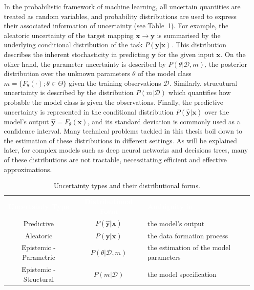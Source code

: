 In the probabilistic framework of machine learning, all uncertain quantities are treated as random variables, and 
probability distributions are used to express their associated information of uncertainty (see Table~\ref{tab:UncTypes}). For example, the aleatoric uncertainty of the target mapping $\textbf{x} \rightarrow \mathbf{y}$ is summarised by the underlying conditional distribution of the task $P(\mathbf{y}|\mathbf{x})$. This distribution describes the inherent stochasticity in predicting $\mathbf{y}$ for the given input $\mathbf{x}$. On the other hand, the parameter uncertainty is described by $P(\theta|\mathcal{D}, m)$, the posterior distribution over the unknown parameters $\theta$ of the model class $m=\{F_{\theta}(\cdot); \theta \in \Theta\}$ given the training observations $\mathcal{D}$. Similarly, strucutural uncertainty is described by the distribution $P(m|\mathcal{D})$ which quantifies how probable the model class is given the observations. Finally, the predictive uncertainty is represented in the conditional distribution $P(\hat{\mathbf{y}}|\mathbf{x})$ over the model's output $\hat{\mathbf{y}}=F_{\theta}(\mathbf{x})$, and its standard deviation is commonly used as a confidence interval. Many technical problems tackled in this thesis boil down to the estimation of these distributions in different settings. As will be explained later, for complex models such as deep neural networks and decisions trees, many of these distributions are not tractable, necessitating efficient and effective approximations. 

\begin{table}[h!]
    \centering
    \footnotesize
    \caption{\footnotesize Uncertainty types and their distributional forms.}
    \begin{tabularx}{\linewidth}{ c c X }
        \rowcolor{black}
        \textcolor{white}{\textbf{Uncertainty Type}} & \textcolor{white}{\textbf{Distributional Form}} & \textcolor{white}{\textbf{Ambiguity in }} \\
        \arrayrulecolor{white}\hline
        \rowcolor{gray!15}
        Predictive& $P(\hat{\mathbf{y}}|\mathbf{x})$ &   the model's output\\
        \arrayrulecolor{white}\hline
        \rowcolor{gray!15}
        Aleatoric& $P(\mathbf{y}|\mathbf{x})$ &  the data formation process\\
        \arrayrulecolor{white}\hline
        \rowcolor{gray!15}
        Epistemic - Parametric & $P(\theta|\mathcal{D},m)$ & the estimation of the model parameters \\
        \arrayrulecolor{white}\hline
        \rowcolor{gray!15}
        Epistemic - Structural &  $P(m|\mathcal{D})$  & the model specification \\
    \end{tabularx}
    \label{tab:UncTypes}
\end{table}

